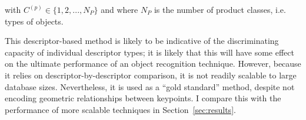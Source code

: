 \noindent with $C^{(p)} \in \lbrace 1, 2,..., N_P\rbrace $ and where $N_P$ is the number of product classes, i.e. types of objects.

This descriptor-based method is likely to be indicative of the discriminating capacity of individual descriptor types; it is likely that this will have some effect on the ultimate performance of an object recognition technique. However, because it relies on descriptor-by-descriptor comparison, it is not readily scalable to large database sizes. Nevertheless, it is used as a ``gold standard'' method, despite not encoding geometric relationships between keypoints. I compare this with the performance of more scalable techniques in Section~\ref{sec:results}.



%
%


